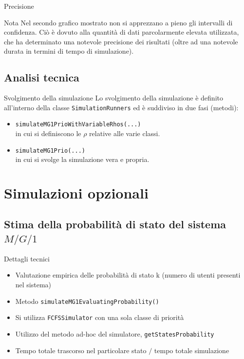 \documentclass[slidestop,compress,mathserif]{beamer}
\begin{document}
\begin{frame}{Precisione}
\vfill
\begin{block}{Nota}
Nel secondo grafico mostrato non si apprezzano a pieno gli intervalli di confidenza. Ci\`o \`e dovuto alla quantit\`a di dati parcolarmente elevata utilizzata, che  ha determinato una notevole precisione dei risultati (oltre ad una notevole durata in termini di tempo di simulazione).
\end{block}
\vfill
\end{frame}

\subsection{Analisi tecnica}
\begin{frame}{Svolgimento della simulazione}
\vfill
Lo svolgimento della simulazione \`e definito all'interno della classe {\tt SimulationRunners} ed \`e suddiviso in due fasi (metodi):
\begin{itemize}
\item {\tt simulateMG1PrioWithVariableRhos(...)}\\
in cui si definiscono le $\rho$ relative alle varie classi.
\item {\tt simulateMG1Prio(...)}\\
in cui si svolge la simulazione vera e propria.
\end{itemize}
\vfill
\end{frame}

\section{Simulazioni opzionali}
\subsection{Stima della probabilit\`a di stato del sistema $M/G/1$}
\begin{frame}{Dettagli tecnici}
\vfill
\begin{itemize}
	\item Valutazione empirica delle probabilit\`a di stato k (numero di utenti presenti nel sistema)
	\item Metodo {\tt simulateMG1EvaluatingProbability()}
	\item Si utilizza {\tt FCFSSimulator} con una sola classe di priorit\`a
	\item Utilizzo del metodo ad-hoc del simulatore, {\tt getStatesProbability}
	\item Tempo totale trascorso nel particolare stato $/$ tempo totale simulazione
\end{itemize}
\vfill
\end{frame}
\end{document}
